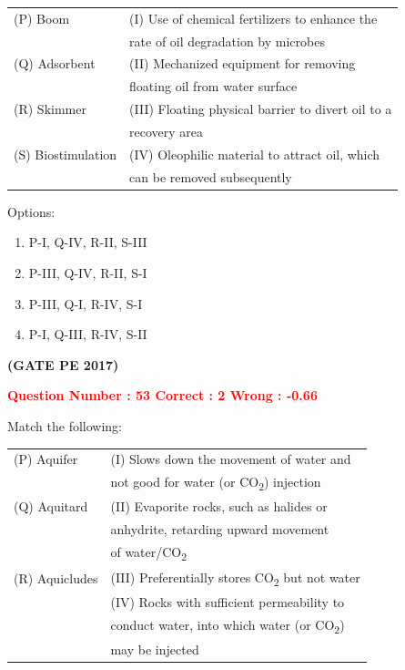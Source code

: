 \documentclass[12pt]{article}
\begin{document}
{\begin{tabular}{ll}
(P) Boom          & (I) Use of chemical fertilizers to enhance the \\
                  & \hfill rate of oil degradation by microbes \\
(Q) Adsorbent     & (II) Mechanized equipment for removing \\
                  & \hfill floating oil from water surface \\
(R) Skimmer       & (III) Floating physical barrier to divert oil to a \\
                  & \hfill recovery area \\
(S) Biostimulation & (IV) Oleophilic material to attract oil, which \\
                  & \hfill can be removed subsequently \\
\end{tabular}


Options:
\begin{enumerate}[label=(\Alph*)]
    \item P-I, Q-IV, R-II, S-III  
    \item P-III, Q-IV, R-II, S-I  
    \item P-III, Q-I, R-IV, S-I  
    \item P-I, Q-III, R-IV, S-II  
\end{enumerate}

\hfill\textbf{(GATE PE 2017)}\\[0.6cm]

\newpage

\textcolor{red}{\textbf{Question Number : 53 \hfill Correct : 2  Wrong : -0.66}}



Match the following:\\[0.6cm]


\begin{tabular}{ll}
(P) Aquifer     & (I) Slows down the movement of water and \\
                & \hfill not good for water (or CO\textsubscript{2}) injection \\
(Q) Aquitard    & (II) Evaporite rocks, such as halides or \\
                & \hfill anhydrite, retarding upward movement \\
                & \hfill of water/CO\textsubscript{2} \\
(R) Aquicludes  & (III) Preferentially stores CO\textsubscript{2} but not water \\
                & (IV) Rocks with sufficient permeability to \\
                & \hfill conduct water, into which water (or CO\textsubscript{2}) \\
                & \hfill may be injected \\
\end{tabular}

}
\end{document}
